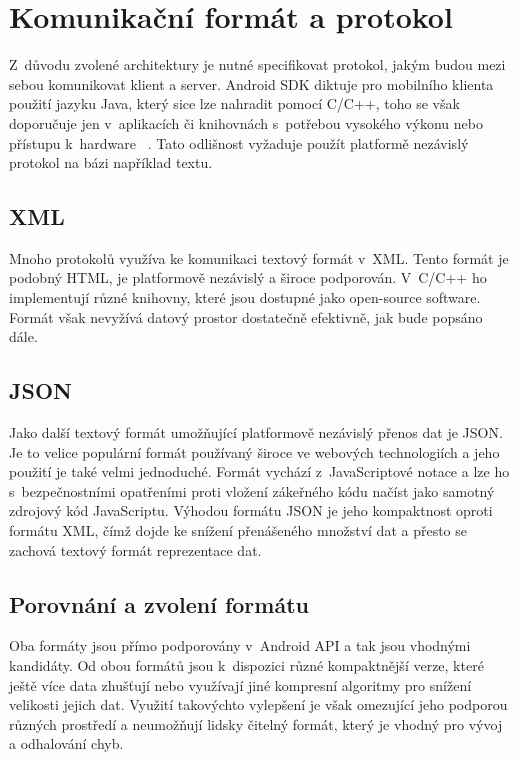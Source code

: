 \documentclass[thesis=B,czech]{FITthesis}[2013/10/20]
\begin{document}
\section{Komunikační formát a protokol}

Z~důvodu zvolené architektury je nutné specifikovat protokol, jakým budou mezi sebou komunikovat klient a server. Android SDK diktuje pro mobilního klienta použití jazyku Java, který sice lze nahradit pomocí C/C++, toho se však doporučuje jen v~aplikacích či knihovnách s~potřebou vysokého výkonu nebo přístupu k~hardware ~\cite{android_ndk}. Tato odlišnost vyžaduje použít platformě nezávislý protokol na bázi například textu.

\subsection{XML}

Mnoho protokolů využíva ke komunikaci textový formát v~XML. Tento formát je podobný HTML, je platformově nezávislý a široce podporován. V~C/C++ ho implementují různé knihovny, které jsou dostupné jako open-source software. Formát však nevyžívá datový prostor dostatečně efektivně, jak bude popsáno dále.

\subsection{JSON}

Jako další textový formát umožňující platformově nezávislý přenos dat je JSON. Je to velice populární formát používaný široce ve webových technologiích a jeho použití je také velmi jednoduché. Formát vychází z~JavaScriptové notace a lze ho s~bezpečnostními opatřeními proti vložení zákeřného kódu načíst jako samotný zdrojový kód JavaScriptu. Výhodou formátu JSON je jeho kompaktnost oproti formátu XML, čímž dojde ke snížení přenášeného množství dat a přesto se zachová textový formát reprezentace dat.

\subsection{Porovnání a zvolení formátu}

Oba formáty jsou přímo podporovány v~Android API a tak jsou vhodnými kandidáty. Od obou formátů jsou k~dispozici různé kompaktnější verze, které ještě více data zhušťují nebo využívají jiné kompresní algoritmy pro snížení velikosti jejich dat. Využití takovýchto vylepšení je však omezující jeho podporou různých prostředí a neumožňují lidsky čitelný formát, který je vhodný pro vývoj a odhalování chyb.
\end{document}
